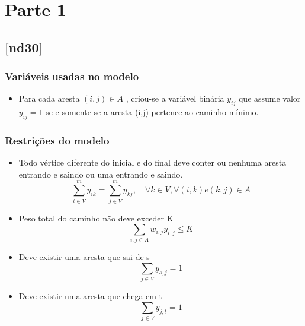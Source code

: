 \documentclass[11pt,letterpaper]{article}
\begin{document}
 
\section{Parte 1}

\subsection{{[}nd30{]}}
\subsubsection*{Variáveis usadas no modelo}
\begin{itemize}
\item Para cada aresta $(i,j) \in A$ , criou-se
a variável binária $y_{ij}$ que assume valor $y_{ij}=1$ se e somente se a aresta (i,j)
pertence ao caminho mínimo.
\end{itemize}

\subsubsection*{Restrições do modelo}
\begin{itemize}

\item Todo vértice diferente do inicial e do final deve conter ou
  nenhuma aresta entrando e saindo ou uma entrando e saindo.
\begin{equation*}
  \sum_{i \in V}^{m}y_{ik}=\sum_{j \in V}^{m}y_{kj},\quad \forall k \in V,
  \forall (i,k) e (k,j) \in A 
\end{equation*}

\item Peso total do caminho não deve exceder K
\begin{equation*}
\sum_{{i,j} \in A}w_{i,j}y_{i,j} \leq K
\end{equation*}

\item Deve existir uma aresta que sai de s
\begin{equation*}
\sum_{j \in V}y_{s,j} = 1 
\end{equation*}

\item Deve existir uma aresta que chega em t
\begin{equation*}
\sum_{j \in V}y_{j,t} = 1 
\end{equation*}

\end{itemize}
\end{document}
